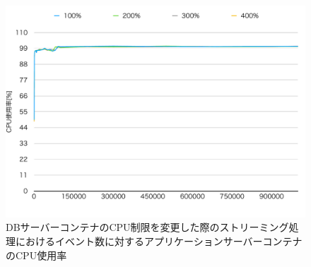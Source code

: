 \documentclass[../../../../../main]{subfiles}
\begin{document}
    \begin{figure}[H]
        \centering
        \includegraphics[width=12cm]{graph}
        \caption{DBサーバーコンテナのCPU制限を変更した際のストリーミング処理におけるイベント数に対するアプリケーションサーバーコンテナのCPU使用率}
        \label{fig:stream-change-db-cpu-limit-app-cpu-app_4_8192-db_1024}
    \end{figure}
\end{document}
